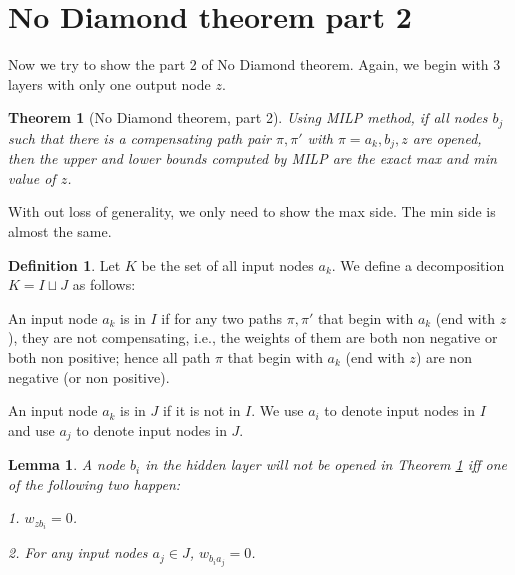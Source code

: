 \documentclass[]{article}
\newtheorem{theorem}{Theorem}
\newtheorem{lemma}{Lemma}
\theoremstyle{definition}
\newtheorem{definition}{Definition}
\begin{document}
\section{No Diamond theorem part 2}

Now we try to show the part 2 of No Diamond theorem. Again, we begin with 3 layers with only one output node $z$.

\begin{theorem}[No Diamond theorem, part 2] \label{no_diamond_2}
	Using MILP method, if all nodes $b_j$ such that there is a compensating path pair $\pi,\pi'$ with $\pi = a_k,b_j,z$ are opened, then the upper and lower bounds computed by MILP are the exact max and min value of $z$.
\end{theorem}

With out loss of generality, we only need to show the max side. The min side is almost the same.



\begin{definition}
	Let $K$ be the set of all input nodes $a_k$. We define a decomposition $K=I\sqcup J$ as follows:  
	
	An input node $a_k$ is in $I$ if for any two paths $\pi,\pi'$ that begin with $a_k$ (end with $z$), they are not compensating, i.e., the weights of them are both non negative or both non positive; hence all path $\pi$ that begin with $a_k$ (end with $z$) are non negative (or non positive).
	
	An input node $a_k$ is in $J$ if it is not in $I$. We use $a_i$ to denote input nodes in $I$ and use $a_j$ to denote input nodes in $J$.
\end{definition} 


\begin{lemma}
	A node $b_i$ in the hidden layer will not be opened in Theorem \ref{no_diamond_2} iff one of the following two happen:
	
	1. $w_{zb_i}=0$.
	
	2. For any input nodes $a_j\in J$, $w_{b_ia_j}=0$.
\end{lemma}
\end{document}

